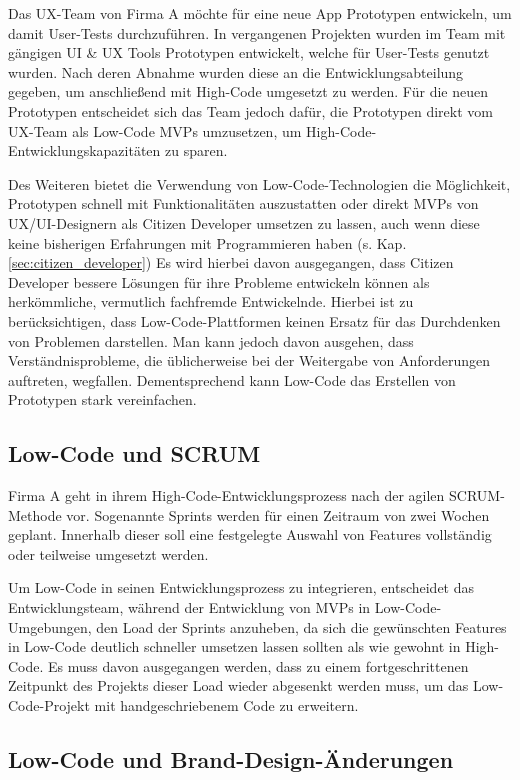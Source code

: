 \documentclass[acmtog, language=ngerman]{acmart}
\begin{document}
Das UX-Team von Firma A möchte für eine neue App Prototypen entwickeln, um damit User-Tests durchzuführen. In vergangenen Projekten wurden im Team mit gängigen UI \& UX Tools Prototypen entwickelt, welche für User-Tests genutzt wurden. Nach deren Abnahme wurden diese an die Entwicklungsabteilung gegeben, um anschließend mit High-Code umgesetzt zu werden. Für die neuen Prototypen entscheidet sich das Team jedoch dafür, die Prototypen direkt vom UX-Team als Low-Code MVPs umzusetzen, um High-Code-Entwicklungskapazitäten zu sparen. 

Des Weiteren bietet die Verwendung von Low-Code-Technologien die Möglichkeit, Prototypen schnell mit Funktionalitäten auszustatten oder direkt MVPs von UX/UI-Designern als Citizen Developer umsetzen zu lassen, auch wenn diese keine bisherigen Erfahrungen mit Programmieren haben (s. Kap. \ref{sec:citizen_developer}) 
Es wird hierbei davon ausgegangen, dass Citizen Developer bessere Lösungen für ihre Probleme entwickeln können als herkömmliche, vermutlich fachfremde Entwickelnde. Hierbei ist zu berücksichtigen, dass Low-Code-Plattformen keinen Ersatz für das Durchdenken von Problemen darstellen.
Man kann jedoch davon ausgehen, dass Verständnisprobleme, die üblicherweise bei der Weitergabe von Anforderungen auftreten, wegfallen. Dementsprechend kann Low-Code das Erstellen von Prototypen stark vereinfachen. \cite{Strengths_and_Weaknesses_of_Low-Code/No-Code_Tools_2022}


\subsection{Low-Code und SCRUM}

Firma A geht in ihrem High-Code-Entwicklungsprozess nach der agilen SCRUM-Methode vor. Sogenannte Sprints werden für einen Zeitraum von zwei Wochen geplant. Innerhalb dieser soll eine festgelegte Auswahl von Features vollständig oder teilweise umgesetzt werden.

Um Low-Code in seinen Entwicklungsprozess zu integrieren, entscheidet das Entwicklungsteam, während der Entwicklung von MVPs in Low-Code-Umgebungen, den Load der Sprints anzuheben, da sich die gewünschten Features in Low-Code deutlich schneller umsetzen lassen sollten als wie gewohnt in High-Code. Es muss davon ausgegangen werden, dass zu einem fortgeschrittenen Zeitpunkt des Projekts dieser Load wieder abgesenkt werden muss, um das Low-Code-Projekt mit handgeschriebenem Code zu erweitern.

\subsection{Low-Code und Brand-Design-Änderungen} \label{sec:UI}
\end{document}
